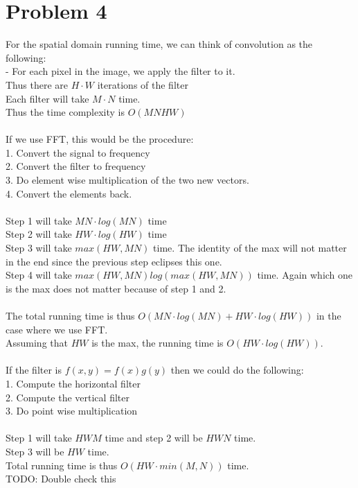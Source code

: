 \documentclass[11pt,psfig]{article}
\begin{document}
\newpage

\section*{Problem 4}

For the spatial domain running time, we can think of convolution as the following:\\
- For each pixel in the image, we apply the filter to it. \\
Thus there are $H \cdot W$ iterations of the filter\\
Each filter will take $M \cdot N$ time. \\
Thus the time complexity is $O(MNHW)$\\
\\
If we use FFT, this would be the procedure:\\
1. Convert the signal to frequency\\
2. Convert the filter to frequency \\
3. Do element wise multiplication of the two new vectors. \\
4. Convert the elements back. \\
\\
Step 1 will take $MN \cdot log(MN)$ time\\
Step 2 will take $HW \cdot log(HW)$ time\\
Step 3 will take $max(HW,MN)$ time. The identity of the max will not matter in the end since the previous step eclipses this one. \\
Step 4 will take $max(HW,MN) log( max(HW, MN) )$ time. Again which one is the max does not matter because of step 1 and 2. \\
\\
The total running time is thus $O(MN \cdot log(MN) + HW \cdot log(HW) )$ in the case where we use FFT. \\
Assuming that $HW$ is the max, the running time is $O(HW \cdot log(HW))$. \\
\\
If the filter is $f(x,y) = f(x)g(y)$ then we could do the following:\\
1. Compute the horizontal filter\\
2. Compute the vertical filter\\
3. Do point wise multiplication \\
\\
Step 1 will take $HWM$ time and step 2 will be $HWN$ time. \\
Step 3 will be $HW$ time. \\
Total running time is thus $O( HW \cdot min(M,N))$ time. \\
TODO: Double check this
\end{document}
